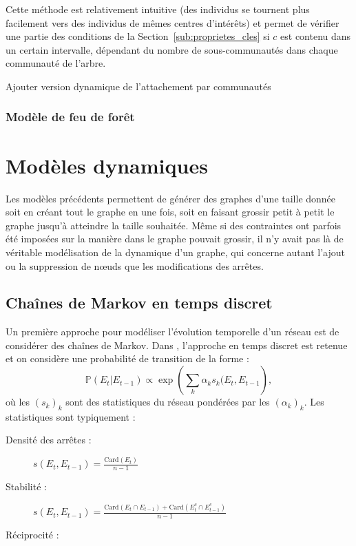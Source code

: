 \documentclass[a4paper]{article}
\newcommand{\card}[1]{\mathrm{Card}\left( #1 \right)}
\begin{document}
    Cette méthode est relativement intuitive (des individus se tournent plus
    facilement vers des individus de mêmes centres d'intérêts) et permet de
    vérifier une partie des conditions de la Section~\ref{sub:proprietes_cles}
    si $c$ est contenu dans un certain intervalle, dépendant du nombre de
    sous-communautés dans chaque communauté de l'arbre.
\begin{todo}
Ajouter version dynamique de l'attachement par communautés
\end{todo}

    \subsubsection{Modèle de feu de forêt}

    \section{Modèles dynamiques}
    \label{sec:modeles_dynamiques}
    Les modèles précédents permettent de générer des graphes d'une taille
    donnée soit en créant tout le graphe en une fois, soit en faisant grossir
    petit à petit le graphe jusqu'à atteindre la taille souhaitée. Même si
    des contraintes ont parfois été imposées sur la manière dans le graphe
    pouvait grossir, il n'y avait pas là de véritable modélisation de la
    dynamique d'un graphe, qui concerne autant l'ajout ou la suppression de
    n\oe{}uds que les modifications des arrêtes.

    \subsection{Chaînes de Markov en temps discret}
    \label{sub:markov_discret}
    Un première approche pour modéliser l'évolution temporelle d'un réseau est
    de considérer des chaînes de Markov. Dans \cite{blei2007statistical},
    l'approche en temps discret est retenue et on considère une probabilité de
    transition de la forme :
    \[
        \mathbb{P}(E_t | E_{t-1}) \propto \exp \left( \sum_k \alpha_k s_k(E_t, E_{t-1} \right),
    \]
    où les $(s_k)_k$ sont des statistiques du réseau pondérées par les $(\alpha_k)_k$.
    Les statistiques sont typiquement :
    \begin{description}
        \item[Densité des arrêtes :] $s(E_t, E_{t-1}) = \frac{\card{E_t}}{n-1}$
        \item[Stabilité :] $s(E_t, E_{t-1}) = \frac{\card{E_t \cap E_{t-1}} + \card{E_t^c \cap E_{t-1}^c}}{n-1}$
        \item[Réciprocité :] 
    \end{description}



\end{document}
